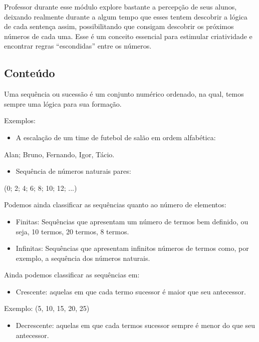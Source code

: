 \protect\hypertarget{_Hlk128407765}{}{}Professor durante esse módulo
explore bastante a percepção de seus alunos, deixando realmente durante
a algum tempo que esses tentem descobrir a lógica de cada sentença
assim, possibilitando que consigam descobrir os próximos números de cada
uma. Esse é um conceito essencial para estimular criatividade e
encontrar regras ``escondidas'' entre os números.

\subsection{Conteúdo}\label{conteuxfado-2}

Uma sequência ou sucessão é um conjunto numérico ordenado, na qual,
temos sempre uma lógica para sua formação.

Exemplos:

\begin{itemize}
\item
  A escalação de um time de futebol de salão em ordem alfabética:
\end{itemize}

Alan; Bruno, Fernando, Igor, Tácio.

\begin{itemize}
\item
  Sequência de números naturais pares:
\end{itemize}

(0; 2; 4; 6; 8; 10; 12; ...)

Podemos ainda classificar as sequências quanto ao número de elementos:

\begin{itemize}
\item
  Finitas: Sequências que apresentam um número de termos bem definido,
  ou seja, 10 termos, 20 termos, 8 termos.
\item
  Infinitas: Sequências que apresentam infinitos números de termos como,
  por exemplo, a sequência dos números naturais.
\end{itemize}

Ainda podemos classificar as sequências em:

\begin{itemize}
\item
  Crescente: aquelas em que cada termo sucessor é maior que seu
  antecessor.
\end{itemize}

Exemplo: (5, 10, 15, 20, 25)

\begin{itemize}
\item
  Decrescente: aquelas em que cada termos sucessor sempre é menor do que
  seu antecessor.
\end{itemize}

